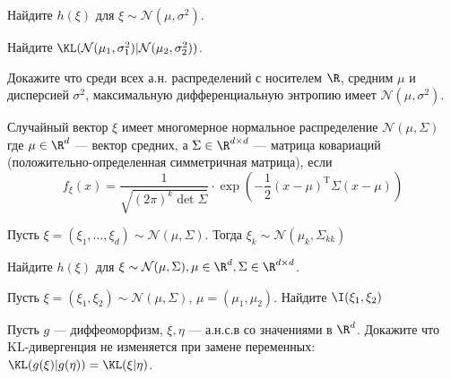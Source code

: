 \documentclass[seminar, recordsfile={../records.lua}]{practice}
\begin{document}
\begin{exercise}
	Найдите $h(\xi)$ для $\xi \sim \mathcal{N}(\mu, \sigma^2)$.
\end{exercise}
\begin{exercise}
	Найдите $\KL(\mathcal{N}(\mu_1, \sigma_1^2) | \mathcal{N}(\mu_2, \sigma_2^2))$.
\end{exercise}
\begin{exercise}
	Докажите что среди всех а.н. распределений с носителем $\R$, средним $\mu$ и дисперсией $\sigma^2$, максимальную дифференциальную энтропию имеет $\mathcal{N}(\mu, \sigma^2)$.
\end{exercise}
\begin{definition}
	Случайный вектор $\xi$ имеет многомерное нормальное распределение $\mathcal{N}(\mu, \Sigma)$ где $\mu \in \R^d$ --- вектор средних, а $\Sigma \in \R^{d \times d}$ --- матрица ковариаций (положительно-определенная симметричная матрица), если
	$$
	f_{\xi}(x) = \frac{1}{\sqrt{(2\pi)^k \det \Sigma}} \cdot \exp(-\frac{1}{2} (x - \mu)^{\mathrm{T}}\Sigma(x - \mu))
	$$
\end{definition}
\begin{proposition}
	Пусть $\xi = (\xi_1, \ldots, \xi_d) \sim \mathcal{N}(\mu, \Sigma)$. Тогда $\xi_k \sim \mathcal{N}(\mu_k, \Sigma_{kk})$
\end{proposition}
\begin{exercise}
	Найдите $h(\xi)$ для $\xi \sim \mathcal{N}(\mu, \Sigma), \mu \in \R^d, \Sigma \in \R^{d \times d}$. 
\end{exercise}
\begin{exercise}
	Пусть $\xi = (\xi_1, \xi_2) \sim \mathcal{N}(\mu, \Sigma)$, $\mu = (\mu_1, \mu_2)$. Найдите $\I(\xi_1, \xi_2)$
\end{exercise}
\begin{exercise}
	Пусть $g$ --- диффеоморфизм, $\xi, \eta$ --- а.н.с.в со значениями в $\R^d$. Докажите что KL-дивергенция не изменяется при замене переменных: $\KL(g(\xi) | g(\eta)) = \KL(\xi | \eta)$.
\end{exercise}
\end{document}
